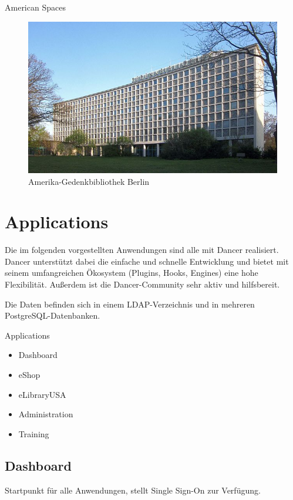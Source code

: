 \begin{frame}{American Spaces}
\begin{figure}
\includegraphics{Amerika-Gedenk-Bibliothek.jpg}
\caption{Amerika-Gedenkbibliothek Berlin}
\end{figure}
\end{frame}

\section{Applications}
    
Die im folgenden vorgestellten Anwendungen sind alle mit Dancer realisiert.
Dancer unterstützt dabei die einfache und schnelle Entwicklung und bietet mit
seinem umfangreichen Ökosystem (Plugins, Hooks, Engines) eine hohe
Flexibilität. Außerdem ist die Dancer-Community sehr aktiv und
hilfsbereit.

Die Daten befinden sich in einem LDAP-Verzeichnis und in
mehreren PostgreSQL-Datenbanken.

\begin{frame}{Applications}
\begin{itemize}
\item Dashboard
\item eShop
\item eLibraryUSA
\item Administration
\item Training
\end{itemize}
\end{frame}

\subsection{Dashboard}
Startpunkt für alle Anwendungen, stellt Single Sign-On zur Verfügung.

